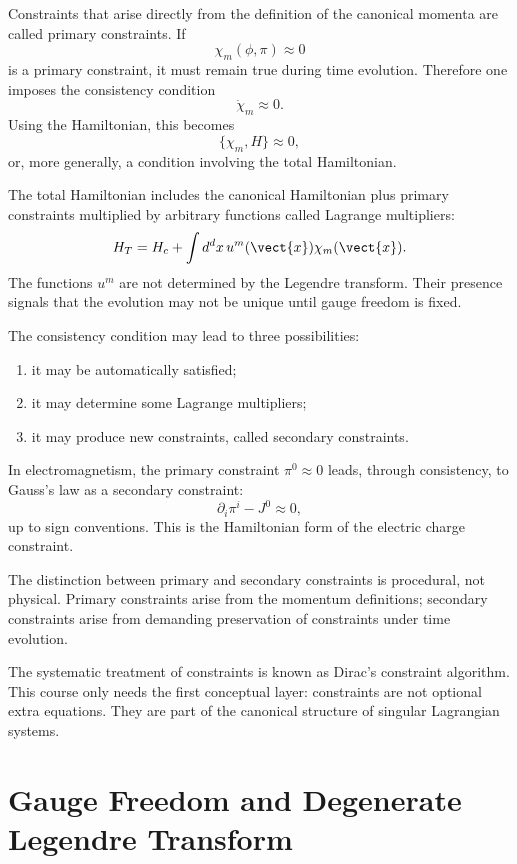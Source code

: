 Constraints that arise directly from the definition of the canonical momenta are
called primary constraints. If
\[
    \chi_m(\phi,\pi)\approx 0
\]
is a primary constraint, it must remain true during time evolution. Therefore
one imposes the consistency condition
\[
    \dot\chi_m\approx 0.
\]
Using the Hamiltonian, this becomes
\[
    \{\chi_m,H\}\approx 0,
\]
or, more generally, a condition involving the total Hamiltonian.

The total Hamiltonian includes the canonical Hamiltonian plus primary
constraints multiplied by arbitrary functions called Lagrange multipliers:
\[
    H_T=H_c+\int d^d x\,u^m(\vect{x})\chi_m(\vect{x}).
\]
The functions \(u^m\) are not determined by the Legendre transform. Their
presence signals that the evolution may not be unique until gauge freedom is
fixed.

The consistency condition may lead to three possibilities:
\begin{enumerate}
    \item it may be automatically satisfied;
    \item it may determine some Lagrange multipliers;
    \item it may produce new constraints, called secondary constraints.
\end{enumerate}

In electromagnetism, the primary constraint \(\pi^0\approx0\) leads, through
consistency, to Gauss's law as a secondary constraint:
\[
    \partial_i\pi^i-J^0\approx0,
\]
up to sign conventions. This is the Hamiltonian form of the electric charge
constraint.

\begin{remarkbox}
The distinction between primary and secondary constraints is procedural, not
physical. Primary constraints arise from the momentum definitions; secondary
constraints arise from demanding preservation of constraints under time
evolution.
\end{remarkbox}

The systematic treatment of constraints is known as Dirac's constraint
algorithm. This course only needs the first conceptual layer: constraints are
not optional extra equations. They are part of the canonical structure of
singular Lagrangian systems.

\section{Gauge Freedom and Degenerate Legendre Transform}

